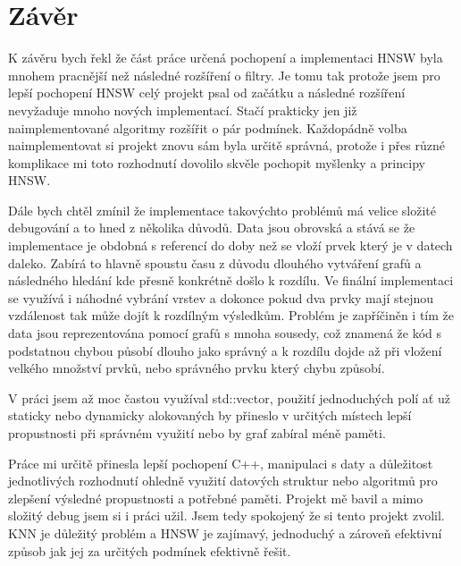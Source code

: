 \documentclass[czech,semestral,dept460,male,csharp,cpdeclaration]{diploma}
\begin{document}
	\chapter{Závěr}
	
		K závěru bych řekl že část práce určená pochopení a implementaci HNSW byla mnohem pracnější než následné rozšíření o filtry. Je tomu tak protože jsem pro lepší pochopení HNSW celý projekt psal od začátku a následné rozšíření nevyžaduje mnoho nových implementací. Stačí prakticky jen již naimplementované algoritmy rozšířit o pár podmínek. Každopádně volba naimplementovat si projekt znovu sám byla určitě správná, protože i přes různé komplikace mi toto rozhodnutí dovolilo skvěle pochopit myšlenky a principy HNSW.
		
		Dále bych chtěl zmínil že implementace takovýchto problémů má velice složité debugování a to hned z několika důvodů. Data jsou obrovská a stává se že implementace je obdobná s referencí do doby než se vloží prvek který je v datech daleko. Zabírá to hlavně spoustu času z důvodu dlouhého vytváření grafů a následného hledání kde přesně konkrétně došlo k rozdílu. Ve finální implementaci se využívá i náhodné vybrání vrstev a dokonce pokud dva prvky mají stejnou vzdálenost tak může dojít k rozdílným výsledkům. Problém je zapříčiněn i tím že data jsou reprezentována pomocí grafů s mnoha sousedy, což znamená že kód s podstatnou chybou působí dlouho jako správný a k rozdílu dojde až při vložení velkého množství prvků, nebo správného prvku který chybu způsobí.
		
		V práci jsem až moc častou využíval std::vector, použití jednoduchých polí ať už staticky nebo dynamicky alokovaných by přineslo v určitých místech lepší propustnosti při správném využití nebo by graf zabíral méně paměti.
		
		Práce mi určitě přinesla lepší pochopení C++, manipulaci s daty a důležitost jednotlivých rozhodnutí ohledně využití datových struktur nebo algoritmů pro zlepšení výsledné propustnosti a potřebné paměti. Projekt mě bavil a mimo složitý debug jsem si i práci užil. Jsem tedy spokojený že si tento projekt zvolil. KNN je důležitý problém a HNSW je zajímavý, jednoduchý a zároveň efektivní způsob jak jej za určitých podmínek efektivně řešit.
	
	\nocite{*}
	
	\printbibliography[title={Literatura}, heading=bibintoc]
	
\end{document}

